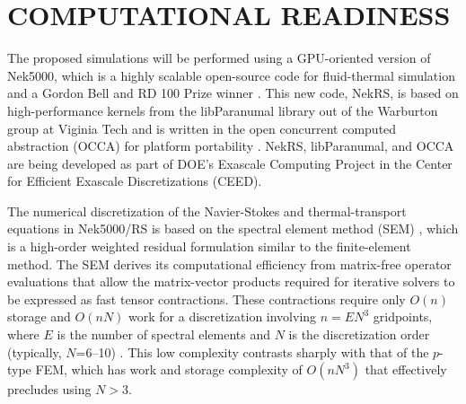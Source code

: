 \newpage
\vspace{-.25in}
\section{COMPUTATIONAL READINESS} %
\vspace{-.2in}


The proposed simulations will be performed using a GPU-oriented version of
Nek5000, which is a highly scalable open-source code for fluid-thermal
simulation and a Gordon Bell and RD 100 Prize winner \cite{tufo99}.  This new
code, NekRS, is based on high-performance kernels from the libParanumal library
out of the Warburton group at Viginia Tech \cite{warb1,warb2} and is written in
the open concurrent computed abstraction (OCCA) for platform portability
\cite{occa}.  NekRS, libParanumal, and OCCA are being developed as part of
DOE's Exascale Computing Project in the Center for Efficient Exascale
Discretizations (CEED). 

The numerical discretization of the Navier-Stokes and thermal-transport equations
in Nek5000/RS is based on the spectral element method (SEM) \cite{pat84}, which
is a high-order weighted residual formulation similar to the finite-element method.   
The SEM derives its computational efficiency from matrix-free operator
evaluations that allow the matrix-vector products required for iterative
solvers to be expressed as fast tensor contractions.  These contractions
require only $O(n)$ storage and $O(nN)$ work for a discretization involving
$n=EN^3$ gridpoints, where $E$ is the number of spectral elements and $N$ is
the discretization order (typically, $N$=6--10) \cite{dfm02}.  This low
complexity contrasts sharply with that of the $p$-type FEM, which has work and
storage complexity of $O(nN^3)$ that effectively precludes using $N>3$.  

